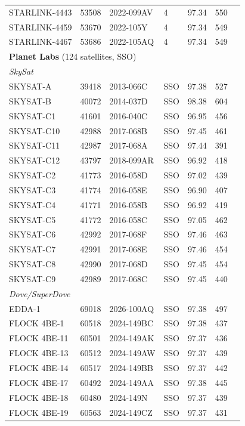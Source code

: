 \begin{longtable}{p{3.5cm}lllccc}
STARLINK-4443 & 53508 & 2022-099AV & 4 & 97.34 & 550 \\
STARLINK-4459 & 53670 & 2022-105Y & 4 & 97.34 & 549 \\
STARLINK-4467 & 53686 & 2022-105AQ & 4 & 97.34 & 549 \\
\midrule
\multicolumn{6}{l}{\textbf{Planet Labs} (124 satellites, SSO)} \\[2pt]
\multicolumn{6}{l}{\textit{SkySat}} \\
SKYSAT-A & 39418 & 2013-066C & SSO & 97.38 & 527 \\
SKYSAT-B & 40072 & 2014-037D & SSO & 98.38 & 604 \\
SKYSAT-C1 & 41601 & 2016-040C & SSO & 96.95 & 456 \\
SKYSAT-C10 & 42988 & 2017-068B & SSO & 97.45 & 461 \\
SKYSAT-C11 & 42987 & 2017-068A & SSO & 97.44 & 391 \\
SKYSAT-C12 & 43797 & 2018-099AR & SSO & 96.92 & 418 \\
SKYSAT-C2 & 41773 & 2016-058D & SSO & 97.02 & 439 \\
SKYSAT-C3 & 41774 & 2016-058E & SSO & 96.90 & 407 \\
SKYSAT-C4 & 41771 & 2016-058B & SSO & 96.92 & 419 \\
SKYSAT-C5 & 41772 & 2016-058C & SSO & 97.05 & 462 \\
SKYSAT-C6 & 42992 & 2017-068F & SSO & 97.46 & 463 \\
SKYSAT-C7 & 42991 & 2017-068E & SSO & 97.46 & 454 \\
SKYSAT-C8 & 42990 & 2017-068D & SSO & 97.45 & 454 \\
SKYSAT-C9 & 42989 & 2017-068C & SSO & 97.45 & 440 \\
\midrule
\multicolumn{6}{l}{\textit{Dove/SuperDove}} \\
EDDA-1 & 69018 & 2026-100AQ & SSO & 97.38 & 497 \\
FLOCK 4BE-1 & 60518 & 2024-149BC & SSO & 97.38 & 437 \\
FLOCK 4BE-11 & 60501 & 2024-149AK & SSO & 97.37 & 436 \\
FLOCK 4BE-13 & 60512 & 2024-149AW & SSO & 97.37 & 439 \\
FLOCK 4BE-14 & 60517 & 2024-149BB & SSO & 97.37 & 442 \\
FLOCK 4BE-17 & 60492 & 2024-149AA & SSO & 97.38 & 445 \\
FLOCK 4BE-18 & 60480 & 2024-149N & SSO & 97.37 & 439 \\
FLOCK 4BE-19 & 60563 & 2024-149CZ & SSO & 97.37 & 431 \\

\end{longtable}
